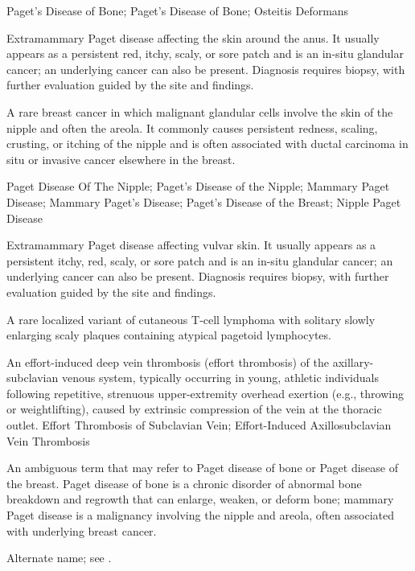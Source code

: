 \synonyms
Paget's Disease of Bone; Paget’s Disease of Bone; Osteitis Deformans

 Extramammary Paget disease affecting the skin around the anus. It usually appears as a persistent red, itchy, scaly, or sore patch and is an in-situ glandular cancer; an underlying cancer can also be present. Diagnosis requires biopsy, with further evaluation guided by the site and findings.

 A rare breast cancer in which malignant glandular cells involve the skin of the nipple and often the areola. It commonly causes persistent redness, scaling, crusting, or itching of the nipple and is often associated with ductal carcinoma in situ or invasive cancer elsewhere in the breast.

\synonyms
Paget Disease Of The Nipple; Paget's Disease of the Nipple; Mammary Paget Disease; Mammary Paget's Disease; Paget's Disease of the Breast; Nipple Paget Disease

 Extramammary Paget disease affecting vulvar skin. It usually appears as a persistent itchy, red, scaly, or sore patch and is an in-situ glandular cancer; an underlying cancer can also be present. Diagnosis requires biopsy, with further evaluation guided by the site and findings.

 A rare localized variant of cutaneous T-cell lymphoma with solitary slowly enlarging scaly plaques containing atypical pagetoid lymphocytes.

 An effort-induced deep vein thrombosis (effort thrombosis) of the axillary-subclavian venous system, typically occurring in young, athletic individuals following repetitive, strenuous upper-extremity overhead exertion (e.g., throwing or weightlifting), caused by extrinsic compression of the vein at the thoracic outlet.
\synonyms
Effort Thrombosis of Subclavian Vein; Effort-Induced Axillosubclavian Vein Thrombosis

 An ambiguous term that may refer to Paget disease of bone or Paget disease of the breast. Paget disease of bone is a chronic disorder of abnormal bone breakdown and regrowth that can enlarge, weaken, or deform bone; mammary Paget disease is a malignancy involving the nipple and areola, often associated with underlying breast cancer.

 Alternate name; see .

